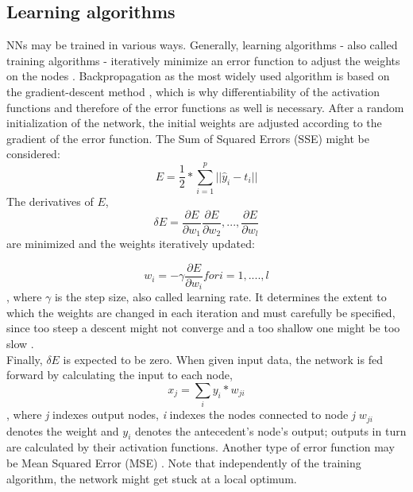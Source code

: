 \documentclass[a4paper, 11pt]{article}
\begin{document}
\subsection{Learning algorithms}

NNs may be trained in various ways. Generally, learning algorithms - also called training algorithms - iteratively minimize an error function to adjust the weights on the nodes \citep{Nakamura.2005}. Backpropagation as the most widely used algorithm is based on the gradient-descent method \citep{Rojas.1996}, which is why differentiability of the activation functions and therefore of the error functions as well is necessary. After a random initialization of the network, the initial weights are adjusted according to the gradient of the error function. The Sum of Squared Errors (SSE) might be considered:
\begin{equation} E = \frac{1}{2}*\sum_{i=1}^{p}||\hat{y}_{i} - t_{i}||\end{equation}
The derivatives of $E$, 
\begin{equation}
\delta E = {\frac{\partial E}{\partial w_{1}}\frac{\partial E}{\partial w_{2}},...,\frac{\partial E}{\partial w_{l}}}
\end{equation}
 are minimized and the weights iteratively updated:

\begin{equation}
w_{i} = -\gamma\frac{\partial E}{\partial w_{i}} for \textit{i} = 1, ...., \textit{l}
\end{equation}
, where $\gamma$ is the step size, also called learning rate. It determines the extent to which the weights are changed in each iteration and must carefully be specified, since too steep a descent might not converge and a too shallow one might be too slow \citep{Zhang.1998}.\\
Finally, $\delta E$ is expected to be zero.
When given input data, the network is fed forward by calculating the input to each node,
\begin{equation}
x_j = \sum_{i}y_{i}*w_{ji}
\end{equation}, where \textit{j} indexes output nodes, \textit{i} indexes the nodes connected to node \textit{j} $w_{ji}$ denotes the weight and $y_{i}$ denotes the antecedent's node's output; outputs in turn are calculated by their activation functions. \citep{Rumelhart.1986}
Another type of error function may be Mean Squared Error (MSE) \citep{Zhang.1998}. Note that independently of the training algorithm, the network might get stuck at a local optimum.
\end{document}

